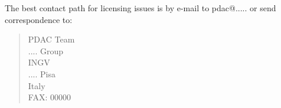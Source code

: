 The best contact path for licensing issues is by e-mail to pdac@.....
or send correspondence to:
\begin{verse}
                             PDAC Team\\
                             .... Group\\
                             INGV\\
                             .... Pisa\\
                             Italy\\
                             FAX: 00000
\end{verse}


